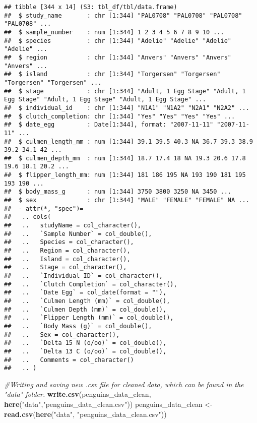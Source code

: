 \documentclass[
]{article}
\newenvironment{Shaded}{\begin{snugshade}}{\end{snugshade}}
\newcommand{\CommentTok}[1]{\textcolor[rgb]{0.56,0.35,0.01}{\textit{#1}}}
\newcommand{\FunctionTok}[1]{\textcolor[rgb]{0.13,0.29,0.53}{\textbf{#1}}}
\newcommand{\NormalTok}[1]{#1}
\newcommand{\OtherTok}[1]{\textcolor[rgb]{0.56,0.35,0.01}{#1}}
\newcommand{\StringTok}[1]{\textcolor[rgb]{0.31,0.60,0.02}{#1}}
\begin{document}
\begin{verbatim}
## tibble [344 x 14] (S3: tbl_df/tbl/data.frame)
##  $ study_name       : chr [1:344] "PAL0708" "PAL0708" "PAL0708" "PAL0708" ...
##  $ sample_number    : num [1:344] 1 2 3 4 5 6 7 8 9 10 ...
##  $ species          : chr [1:344] "Adelie" "Adelie" "Adelie" "Adelie" ...
##  $ region           : chr [1:344] "Anvers" "Anvers" "Anvers" "Anvers" ...
##  $ island           : chr [1:344] "Torgersen" "Torgersen" "Torgersen" "Torgersen" ...
##  $ stage            : chr [1:344] "Adult, 1 Egg Stage" "Adult, 1 Egg Stage" "Adult, 1 Egg Stage" "Adult, 1 Egg Stage" ...
##  $ individual_id    : chr [1:344] "N1A1" "N1A2" "N2A1" "N2A2" ...
##  $ clutch_completion: chr [1:344] "Yes" "Yes" "Yes" "Yes" ...
##  $ date_egg         : Date[1:344], format: "2007-11-11" "2007-11-11" ...
##  $ culmen_length_mm : num [1:344] 39.1 39.5 40.3 NA 36.7 39.3 38.9 39.2 34.1 42 ...
##  $ culmen_depth_mm  : num [1:344] 18.7 17.4 18 NA 19.3 20.6 17.8 19.6 18.1 20.2 ...
##  $ flipper_length_mm: num [1:344] 181 186 195 NA 193 190 181 195 193 190 ...
##  $ body_mass_g      : num [1:344] 3750 3800 3250 NA 3450 ...
##  $ sex              : chr [1:344] "MALE" "FEMALE" "FEMALE" NA ...
##  - attr(*, "spec")=
##   .. cols(
##   ..   studyName = col_character(),
##   ..   `Sample Number` = col_double(),
##   ..   Species = col_character(),
##   ..   Region = col_character(),
##   ..   Island = col_character(),
##   ..   Stage = col_character(),
##   ..   `Individual ID` = col_character(),
##   ..   `Clutch Completion` = col_character(),
##   ..   `Date Egg` = col_date(format = ""),
##   ..   `Culmen Length (mm)` = col_double(),
##   ..   `Culmen Depth (mm)` = col_double(),
##   ..   `Flipper Length (mm)` = col_double(),
##   ..   `Body Mass (g)` = col_double(),
##   ..   Sex = col_character(),
##   ..   `Delta 15 N (o/oo)` = col_double(),
##   ..   `Delta 13 C (o/oo)` = col_double(),
##   ..   Comments = col_character()
##   .. )
\end{verbatim}

\begin{Shaded}
\begin{Highlighting}[]
\CommentTok{\#Writing and saving new .csv file for cleaned data, which can be found in the "data" folder. }
\FunctionTok{write.csv}\NormalTok{(penguins\_data\_clean, }\FunctionTok{here}\NormalTok{(}\StringTok{"data"}\NormalTok{,}\StringTok{"penguins\_data\_clean.csv"}\NormalTok{))}
\NormalTok{penguins\_data\_clean }\OtherTok{\textless{}{-}} \FunctionTok{read.csv}\NormalTok{(}\FunctionTok{here}\NormalTok{(}\StringTok{"data"}\NormalTok{, }\StringTok{"penguins\_data\_clean.csv"}\NormalTok{))}
\end{Highlighting}
\end{Shaded}
\end{document}
